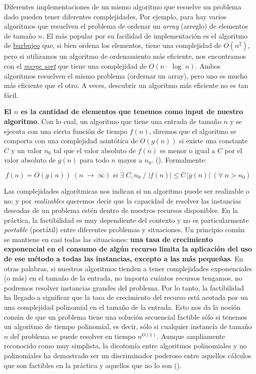 Diferentes implementaciones de un mismo algoritmo que resuelve un problema dado pueden tener diferentes complejidades,
Por ejemplo, para hay varios algoritmos que resuelven el problema de ordenar un \textit{array} (arreglo) de elementos de
tamaño $n$. El más popular por su facilidad de implementación es el algoritmo de
\href{https://es.wikipedia.org/wiki/Ordenamiento_de_burbuja}{burbujeo} que, si bien ordena los elementos, tiene una
complejidad de $O(n^2)$, pero si utilizamos un algoritmo de ordenamiento más eficiente, nos encontramos con el
\href{https://es.wikipedia.org/wiki/Ordenamiento_por_mezcla}{\textit{merge sort}} que tiene una complejidad de $O(n
\cdot \; \log \; n)$. Ambos algoritmos resuelven el mismo problema (ordernar un array), pero uno es mucho más eficiente
que el otro. A veces, descubrir un algoritmo más eficiente no es tan fácil.

\textbf{El $n$ es la cantidad de elementos que tenemos como input de nuestro algoritmo}. Con lo cual, un algoritmo que
tiene una entrada de tamaño $n$ y se ejecuta con una cierta función de tiempo $f(n)$, diremos que el algoritmo se
comporta con una complejidad asintótica de $O(g(n))$ si existe una constante $C$ y un valor $n_0$ tal que el valor
absoluto de $f(n)$ es menor o igual a $C$ por el valor absoluto de $g(n)$ para todo $n$ mayor a $n_0$.
(\textcite{wilf2002}). Formalmente:

\[
  f(n) = O(g(n)) \; (n \; \rightarrow \; \infty) \; si \; \exists \; C, n_0 \; \slash \; \lvert f(n) \rvert \leq C \,
  \lvert g(n) \rvert \; (\forall \; n > n_0)
\]

Las complejidades algorítmicas nos indican si un algoritmo puede ser realizable o no; y por \textit{realizables}
queremos decir que la capacidad de resolver las instancias deseadas de un problema estén dentro de nuestros recursos
disponibles. En la práctica, la factibilidad es muy dependiente del contexto y no es particularmente \textit{portable}
(portátil) entre diferentes problemas y situaciones. Un principio común se mantiene en casi todas las situaciones:
\textbf{una tasa de crecimiento exponencial en el consumo de algún recurso limita la aplicación del uso de ese método a
todas las instancias, excepto a las más pequeñas}. En otras palabras, si nuestros algoritmos tienden a tener
complejidades exponenciales (o más) en el tamaño de la entrada, no importa cuántos recursos tengamos, no podremos
resolver instancias grandes del problema. Por lo tanto, la factibilidad ha llegado a significar que la tasa de
crecimiento del recurso está acotada por un una complejidad polinomial en el tamaño de la entrada. Esto nos da la noción
común de que un problema tiene una solución secuencial factible sólo si tenemos un algoritmo de tiempo polinomial, es
decir, sólo si cualquier instancia de tamaño $n$ del problema se puede resolver en tiempo $n^{O(1)}$. Aunque ampliamente
reconocido como muy simplista, la dicotomía entre algoritmos polinomiales y no polinomiales ha demostrado ser un
discriminador poderoso entre aquellos cálculos que son factibles en la práctica y aquellos que no lo son
(\textcite{greenlaw1995}).

